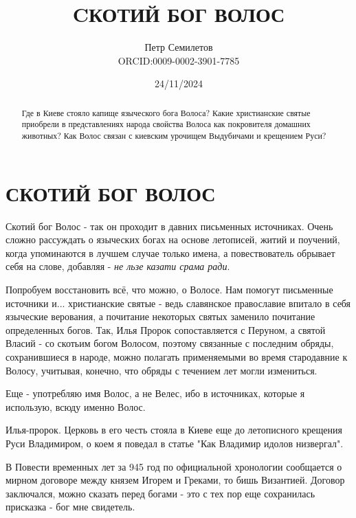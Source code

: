 \documentclass[a5paper,11pt,openany]{article}
\title{CКОТИЙ БОГ ВОЛОС\\
\textsmaller[2]{редакция 1.0}}
\author{Петр Семилетов\\ORCID:0009-0002-3901-7785 \orcidlink{0009-0002-3901-7785}}
\date{24/11/2024}
\begin{document}
\maketitle

\pagestyle{empty}


\newpage

\pagestyle{plain}



%
%
%

\begin{abstract}
Где в Киеве стояло капище языческого бога Волоса? Какие христианские святые приобрели в представлениях народа свойства Волоса как покровителя домашних животных? Как Волос связан с киевским урочищем Выдубичами и крещением Руси?
\end{abstract}


\section{СКОТИЙ БОГ ВОЛОС}

   Скотий бог Волос - так он проходит в давних письменных источниках. Очень сложно рассуждать о языческих богах на основе летописей, житий и поучений, когда упоминаются в лучшем случае только имена, а повествователь обрывает себя на слове, добавляя - \textit{не льзе казати срама ради}.

   Попробуем восстановить всё, что можно, о Волосе. Нам помогут письменные источники и... христианские святые - ведь славянское православие впитало в себя языческие верования, а почитание некоторых святых заменило почитание определенных богов. Так, Илья Пророк сопоставляется с Перуном, а святой Власий - со скотьим богом Волосом, поэтому связанные с последним обряды, сохранившиеся в народе, можно полагать применяемыми во время стародавние к Волосу, учитывая, конечно, что обряды с течением лет могли измениться.

Еще - употребляю имя Волос, а не Велес, ибо в источниках, которые я использую, всюду именно Волос.

Илья-пророк. Церковь в его честь стояла в Киеве еще до летописного крещения Руси Владимиром, о коем я поведал в статье "Как Владимир идолов низвергал".  

В Повести временных лет за 945 год по официальной хронологии сообщается о мирном договоре между князем Игорем и Греками, то бишь Византией. Договор заключался, можно сказать перед богами - это с тех пор еще сохранилась присказка - бог мне свидетель.
\end{document}
